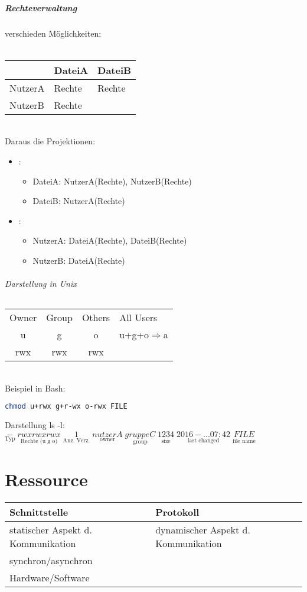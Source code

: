 \paragraph{Rechteverwaltung} verschieden Möglichkeiten:\\
\\
\begin{tabular}{l | l l }
& DateiA & DateiB\\
\hline
NutzerA & Rechte & Rechte\\
NutzerB & Rechte & 
\end{tabular}\\
Daraus die Projektionen:
\begin{itemize}
\item {}:
\begin{itemize}
\item DateiA: NutzerA(Rechte), NutzerB(Rechte)
\item DateiB: NutzerA(Rechte)
\end{itemize}
\item {}:
\begin{itemize}
\item NutzerA: DateiA(Rechte), DateiB(Rechte)
\item NutzerB: DateiA(Rechte)
\end{itemize}
\end{itemize}
\subparagraph{Darstellung in Unix} \parskp
\begin{tabular}{c | c | c l}
Owner & Group & Others & \quad All Users\\
u & g & o & \quad u+g+o$\Rightarrow$a\\
rwx & rwx & rwx
\end{tabular}\\
Beispiel in Bash:
\begin{lstlisting}[language=bash]
chmod u+rwx g+r-wx o-rwx FILE
\end{lstlisting}
Darstellung ls -l:\\
$\underset{\text{Typ}}{-}\;\underset{\text{Rechte (u g o)}}{rwxrwxrwx}\;\underset{\text{Anz. Verz.}}{1}\;\underset{\text{owner}}{nutzerA}\;\underset{\text{group}}{gruppeC}\;\underset{\text{size}}{1234}\;\underset{\text{last changed}}{2016-...07:42}\; \underset{\text{file name}}{FILE}$

\chapter{Ressource}
\begin{tabular}{l | l}
Schnittstelle & Protokoll\\
\hline
statischer Aspekt d. Kommunikation & dynamischer Aspekt d. Kommunikation\\
synchron/asynchron\\
Hardware/Software
\end{tabular}
